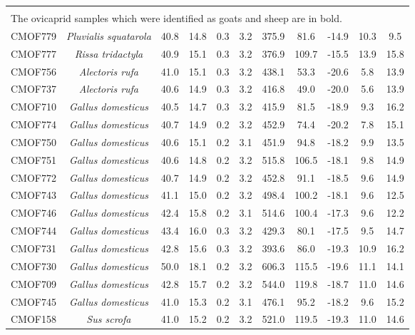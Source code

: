 \documentclass[3p]{elsarticle} %
\begin{document}
\begin{longtable}[t]{c>{}cccccccccc}
\endfoot
\bottomrule
\multicolumn{11}{l}{\rule{0pt}{1em}\textit{Note: }}\\
\multicolumn{11}{l}{\rule{0pt}{1em}The ovicaprid samples which were identified as goats and sheep are in bold.}\\
\endlastfoot
CMOF779 & \em{Pluvialis squatarola} & 40.8 & 14.8 & 0.3 & 3.2 & 375.9 & 81.6 & -14.9 & 10.3 & 9.5\\
CMOF777 & \em{Rissa tridactyla} & 40.9 & 15.1 & 0.3 & 3.2 & 376.9 & 109.7 & -15.5 & 13.9 & 15.8\\
CMOF756 & \em{Alectoris rufa} & 41.0 & 15.1 & 0.3 & 3.2 & 438.1 & 53.3 & -20.6 & 5.8 & 13.9\\
CMOF737 & \em{Alectoris rufa} & 40.6 & 14.9 & 0.3 & 3.2 & 416.8 & 49.0 & -20.0 & 5.6 & 13.9\\
CMOF710 & \em{Gallus domesticus} & 40.5 & 14.7 & 0.3 & 3.2 & 415.9 & 81.5 & -18.9 & 9.3 & 16.2\\
CMOF774 & \em{Gallus domesticus} & 40.7 & 14.9 & 0.2 & 3.2 & 452.9 & 74.4 & -20.2 & 7.8 & 15.1\\
CMOF750 & \em{Gallus domesticus} & 40.6 & 15.1 & 0.2 & 3.1 & 451.9 & 94.8 & -18.2 & 9.9 & 13.5\\
CMOF751 & \em{Gallus domesticus} & 40.6 & 14.8 & 0.2 & 3.2 & 515.8 & 106.5 & -18.1 & 9.8 & 14.9\\
CMOF772 & \em{Gallus domesticus} & 40.7 & 14.9 & 0.2 & 3.2 & 452.8 & 91.1 & -18.5 & 9.6 & 14.9\\
CMOF743 & \em{Gallus domesticus} & 41.1 & 15.0 & 0.2 & 3.2 & 498.4 & 100.2 & -18.1 & 9.6 & 12.5\\
CMOF746 & \em{Gallus domesticus} & 42.4 & 15.8 & 0.2 & 3.1 & 514.6 & 100.4 & -17.3 & 9.6 & 12.2\\
CMOF744 & \em{Gallus domesticus} & 43.4 & 16.0 & 0.3 & 3.2 & 429.3 & 80.1 & -17.5 & 9.5 & 14.7\\
CMOF731 & \em{Gallus domesticus} & 42.8 & 15.6 & 0.3 & 3.2 & 393.6 & 86.0 & -19.3 & 10.9 & 16.2\\
CMOF730 & \em{Gallus domesticus} & 50.0 & 18.1 & 0.2 & 3.2 & 606.3 & 115.5 & -19.6 & 11.1 & 14.1\\
CMOF709 & \em{Gallus domesticus} & 42.8 & 15.7 & 0.2 & 3.2 & 544.0 & 119.8 & -18.7 & 11.0 & 14.6\\
CMOF745 & \em{Gallus domesticus} & 41.0 & 15.3 & 0.2 & 3.1 & 476.1 & 95.2 & -18.2 & 9.6 & 15.2\\
CMOF158 & \em{Sus scrofa} & 41.0 & 15.2 & 0.2 & 3.2 & 521.0 & 119.5 & -19.3 & 11.0 & 14.6\\

\end{longtable}
\end{document}
